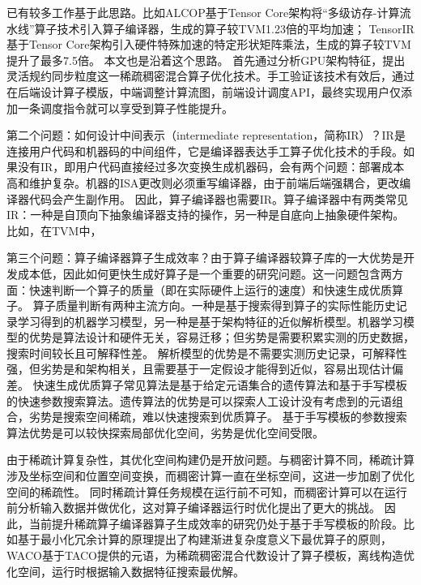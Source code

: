 已有较多工作基于此思路。比如ALCOP\cite{ALCOP}基于Tensor Core架构将“多级访存-计算流水线”算子技术引入算子编译器，生成的算子较TVM1.23倍的平均加速；
TensorIR\cite{TensorIR}基于Tensor Core架构引入硬件特殊加速的特定形状矩阵乘法，生成的算子较TVM提升了最多7.5倍。 本文也是沿着这个思路。
首先通过分析GPU架构特征，提出灵活规约同步粒度这一稀疏稠密混合算子优化技术。手工验证该技术有效后，通过在后端设计算子模版，中端调整计算流图，前端设计调度API，最终实现用户仅添加一条调度指令就可以享受到算子性能提升。

第二个问题：如何设计中间表示（intermediate representation，简称IR）？IR是连接用户代码和机器码的中间组件\cite{IR}，它是编译器表达手工算子优化技术的手段。如果没有IR，即用户代码直接经过多次变换生成机器码，会有两个问题：部署成本高和维护复杂。机器的ISA更改则必须重写编译器，由于前端后端强耦合，更改编译器代码会产生副作用\cite{LLVM}。
因此，算子编译器也需要IR。算子编译器中有两类常见IR：一种是自顶向下抽象编译器支持的操作，另一种是自底向上抽象硬件架构。比如，在TVM\cite{tvm}中，

第三个问题：算子编译器算子生成效率？由于算子编译器较算子库的一大优势是开发成本低，因此如何更快生成好算子是一个重要的研究问题。这一问题包含两方面：快速判断一个算子的质量（即在实际硬件上运行的速度）和快速生成优质算子。
算子质量判断有两种主流方向。一种是基于搜索得到算子的实际性能历史记录学习得到的机器学习模型，另一种是基于架构特征的近似解析模型。机器学习模型的优势是算法设计和硬件无关，容易迁移；但劣势是需要积累实测的历史数据，搜索时间较长且可解释性差\cite{AutoTVM,Ansor,AMOS}。
解析模型的优势是不需要实测历史记录，可解释性强，但劣势是和架构相关，且需要基于一定假设才能得到近似，容易出现估计偏差\cite{GNNAdvisor,Roller,ALCOP}。
快速生成优质算子常见算法是基于给定元语集合的遗传算法和基于手写模板的快速参数搜索算法。遗传算法的优势是可以探索人工设计没有考虑到的元语组合，劣势是搜索空间稀疏，难以快速搜索到优质算子\cite{Hidet}。
基于手写模板的参数搜索算法优势是可以较快探索局部优化空间，劣势是优化空间受限\cite{Auto-Halide}。

由于稀疏计算复杂性，其优化空间构建仍是开放问题。与稠密计算不同，稀疏计算涉及坐标空间和位置空间变换，而稠密计算一直在坐标空间，这进一步加剧了优化空间的稀疏性\cite{senanayake:2020:scheduling}。
同时稀疏计算任务规模在运行前不可知，而稠密计算可以在运行前分析输入数据并做优化，这对算子编译器运行时优化提出了更大的挑战\cite{Dynamic-tiling}。
因此，当前提升稀疏算子编译器算子生成效率的研究仍处于基于手写模板的阶段。比如\cite{ahrens:2022:autoscheduling}基于最小化冗余计算的原理提出了构建渐进复杂度意义下最优算子的原则，
WACO\cite{WACO}基于TACO\cite{kjolstad:2017:taco}提供的元语，为稀疏稠密混合代数设计了算子模板，离线构造优化空间，运行时根据输入数据特征搜索最优解。